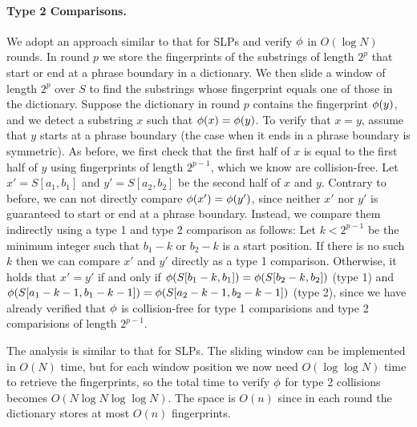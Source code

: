\documentclass[11pt]{article}
\newcommand{\fp}{\ensuremath\phi}
\begin{document}
\paragraph{Type 2 Comparisons.}
We adopt an approach similar to that for SLPs and verify $\fp$ in $O(\log N)$ rounds. In round $p$ we store the fingerprints of the substrings of length $2^p$ that start or end at a phrase boundary in a dictionary. We then slide a window of length $2^p$ over $S$ to find the substrings whose fingerprint equals one of those in the dictionary. Suppose the dictionary in round $p$ contains the fingerprint $\fp(y)$, and we detect a substring $x$ such that $\fp(x)=\fp(y)$. To verify that $x=y$, assume that $y$ starts at a phrase boundary (the case when it ends in a phrase boundary is symmetric). As before, we first check that the first half of $x$ is equal to the first half of $y$ using fingerprints of length $2^{p-1}$, which we know are collision-free. Let $x'=S[a_1,b_1]$ and $y'=S[a_2,b_2]$ be the second half of $x$ and $y$. Contrary to before, we can not directly compare $\fp(x')=\fp(y')$, since neither $x'$ nor $y'$ is guaranteed to start or end at a phrase boundary. Instead, we compare them indirectly using a type 1 and type 2 comparison as follows: Let $k < 2^{p-1}$ be the minimum integer such that $b_1-k$ or $b_2-k$ is a start position. If there is no such $k$ then we can compare $x'$ and $y'$ directly as a type 1 comparison. Otherwise, it holds that $x' = y'$ if and only if $\fp(S[b_1-k,b_1]) = \fp(S[b_2-k,b_2])$ (type 1) and $\fp(S[a_1-k-1,b_1-k-1]) = \fp(S[a_2-k-1,b_2-k-1])$ (type 2), since we have already verified that $\fp$ is collision-free for type 1 comparisions and type 2 comparisions of length $2^{p-1}$.

The analysis is similar to that for SLPs. The sliding window can be implemented in $O(N)$ time, but for each window position we now need $O(\log\log N)$ time to retrieve the fingerprints, so the total time to verify $\fp$ for type 2 collisions becomes $O(N \log N \log\log N)$. The space is $O(n)$ since in each round the dictionary stores at most $O(n)$ fingerprints.







\end{document}
